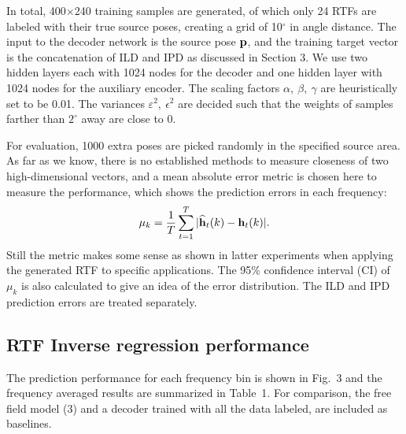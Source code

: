 \documentclass{article}
\begin{document}
In total, 400$\times$240 training samples are generated, of which only 24 RTFs are labeled with their true source poses, creating a grid of 10$^\circ$ in angle distance. The input to the decoder network is the source pose ${\bf p}$, and the training target vector is the concatenation of ILD and IPD as discussed in Section 3. We use two hidden layers each with 1024 nodes for the decoder and one hidden layer with 1024 nodes for the auxiliary encoder. The scaling factors $\alpha,~\beta,~\gamma$ are heuristically set to be 0.01. The variances $\varepsilon^2,~\epsilon^2$ are decided such that the weights of samples farther than $2^\circ$ away are close to 0.

For evaluation, 1000 extra poses are picked randomly in the specified source area. As far as we know, there is no established methods to measure closeness of two high-dimensional vectors, and a mean absolute error metric is chosen here to measure the performance, which shows the prediction errors in each frequency:
\begin{equation}\label{eq:err}
  \mu_k = \frac{1}{T}\sum_{t=1}^{T}|\widehat{\bf h}_t(k)-{\bf h}_t(k)|.
\end{equation}
Still the metric makes some sense as shown in latter experiments when applying the generated RTF to specific applications. The 95\% confidence interval (CI) of $\mu_k$ is also calculated to give an idea of the error distribution. The ILD and IPD prediction errors are treated separately.

\subsection{RTF Inverse regression performance }

The prediction performance for each frequency bin is shown in Fig.~3 and the frequency averaged results are summarized in Table~1. For comparison, the free field model (3) and a decoder trained with all the data labeled, are included as baselines.
\end{document}
